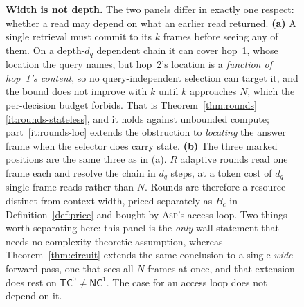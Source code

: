 \documentclass[10pt]{article}
\theoremstyle{definition}
\theoremstyle{plain}
\newcommand{\ASP}{\textsc{Asp}}
\begin{document}
\begin{figure}[!t]
\caption{\textbf{Width is not depth.} The two panels differ in exactly one respect: whether
a read may depend on what an earlier read returned. \textbf{(a)} A single retrieval must
commit to its $k$ frames before seeing any of them. On a depth-$d_q$ dependent chain it can
cover hop~1, whose location the query names, but hop~2's location is a \emph{function of
hop~1's content}, so no query-independent selection can target it, and the bound does not
improve with $k$ until $k$ approaches $N$, which the per-decision budget forbids. That is
Theorem~\ref{thm:rounds}\ref{it:rounds-stateless}, and it holds against unbounded compute;
part~\ref{it:rounds-loc} extends the obstruction to \emph{locating} the answer frame when the
selector does carry state.
\textbf{(b)} The three marked positions are the same three as in (a). $R$ adaptive rounds read one frame each and resolve the chain in $d_q$ steps,
at a token cost of $d_q$ single-frame reads rather than $N$. Rounds are therefore a resource
distinct from context width, priced separately as $B_c$ in Definition~\ref{def:price} and
bought by \ASP{}'s access loop. Two things worth separating here: this panel is the
\emph{only} wall statement that needs no complexity-theoretic assumption, whereas
Theorem~\ref{thm:circuit} extends the same conclusion to a single \emph{wide} forward pass, one that sees all $N$ frames at once, and that extension does rest on
$\mathsf{TC}^0\neq\mathsf{NC}^1$. The case for an access loop does not depend on it.}
\label{fig:rounds}
\end{figure}
\end{document}
